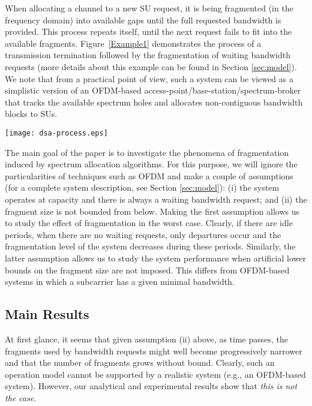 \documentclass{amsart}
\begin{document}
\pagestyle{plain}

When
allocating a channel to a new  SU request, it is  being fragmented (in the  frequency domain)
into available gaps  until the full requested  bandwidth is provided.  This  process repeats itself,
until the  next request fails  to fit into  the available fragments.  Figure~\ref{Example1}
demonstrates the  process of a transmission termination followed by the  fragmentation of waiting bandwidth requests (more details about this example can be found in
Section \ref{sec:model}). We note that from a practical point of view, such a system can be viewed as a simplistic version of an OFDM-based access-point/base-station/spectrum-broker that tracks the available spectrum holes and allocates non-contiguous bandwidth blocks to SUs.

\begin{figure*}[!t]
 \centering
 \texttt{[image: dsa-process.eps]}
\vspace*{-0.3cm}
 \caption{An example of the admission and departure processes and the resulting spectrum fragmentation.}
 \label{Example1}
\end{figure*}

The main  goal of the paper  is to investigate  the phenomena of fragmentation  induced by
spectrum  allocation  algorithms.  For  this   purpose,  we  will ignore  the particularities of techniques such as
OFDM and make a couple of assumptions (for a complete system description,
see Section \ref{sec:model}): (i) the system operates at capacity and there is always a waiting bandwidth request; and (ii) the
fragment size  is not bounded from  below. Making the first assumption allows us to study the effect of fragmentation in the worst case. Clearly, if there  are idle periods,  when there are no waiting requests,  only departures
occur and the fragmentation level of the system decreases during these periods. Similarly, the latter assumption allows us to study the system performance when artificial lower bounds on the fragment size are not imposed. This differs from OFDM-based systems in which a subcarrier  has a given  minimal bandwidth.




\subsection*{Main Results}
At first glance, it seems that given assumption (ii) above, as time passes, the fragments used by bandwidth requests might well become progressively narrower and that the number of fragments grows without bound. Clearly, such an operation model cannot be supported
by a realistic system (e.g., an OFDM-based system). However, our
analytical and experimental results show that \emph{this is not the case}.
\end{document}
